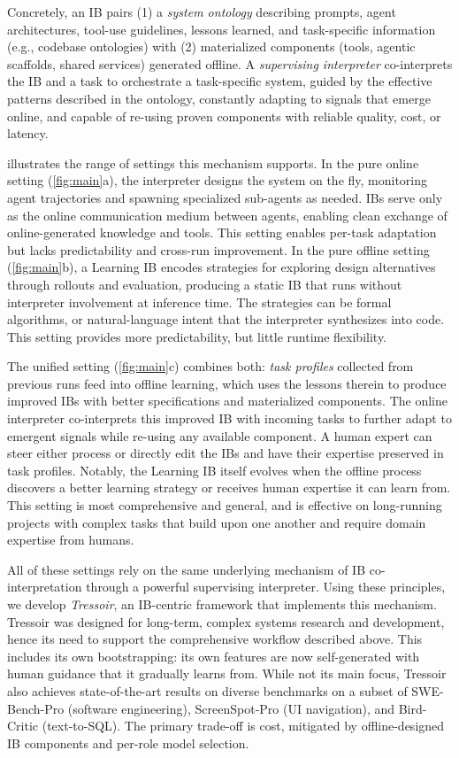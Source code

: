 Concretely, an IB pairs (1) a \textit{system ontology} describing prompts, agent architectures, tool-use guidelines, lessons learned, and task-specific information (e.g., codebase ontologies) with (2) materialized components (tools, agentic scaffolds, shared services) generated offline.
A \textit{supervising interpreter} co-interprets the IB and a task to orchestrate a task-specific system, guided by the effective patterns described in the ontology, constantly adapting to signals that emerge online, and capable of re-using proven components with reliable quality, cost, or latency.

 illustrates the range of settings this mechanism supports. In the pure online setting (\cref{fig:main}a), the interpreter designs the system on the fly, monitoring agent trajectories and spawning specialized sub-agents as needed. IBs serve only as the online communication medium between agents, enabling clean exchange of online-generated knowledge and tools. This setting enables per-task adaptation but lacks predictability and cross-run improvement. In the pure offline setting (\cref{fig:main}b), a Learning IB encodes strategies for exploring design alternatives through rollouts and evaluation, producing a static IB that runs without interpreter involvement at inference time. The strategies can be formal algorithms, or natural-language intent that the interpreter synthesizes into code. This setting provides more predictability, but little runtime flexibility.

The unified setting (\cref{fig:main}c) combines both: \textit{task profiles} collected from previous runs feed into offline learning, which uses the lessons therein to produce improved IBs with better specifications and materialized components. The online interpreter co-interprets this improved IB with incoming tasks to further adapt to emergent signals while re-using any available component. A human expert can steer either process or directly edit the IBs and have their expertise preserved in task profiles. Notably, the Learning IB itself evolves when the offline process discovers a better learning strategy or receives human expertise it can learn from. This setting is most comprehensive and general, and is effective on long-running projects with complex tasks that build upon one another and require domain expertise from humans.

All of these settings rely on the same underlying mechanism of IB co-interpretation through a powerful supervising interpreter. Using these principles, we develop \textit{Tressoir}, an IB-centric framework that implements this mechanism. Tressoir was designed for long-term, complex systems research and development, hence its need to support the comprehensive workflow described above. This includes its own bootstrapping: its own features are now self-generated with human guidance that it gradually learns from. While not its main focus, Tressoir also achieves state-of-the-art results on diverse benchmarks on a subset of SWE-Bench-Pro (software engineering), ScreenSpot-Pro (UI navigation), and Bird-Critic (text-to-SQL). The primary trade-off is cost, mitigated by offline-designed IB components and per-role model selection.


